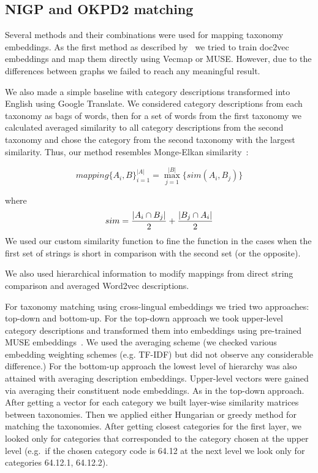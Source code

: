 \documentclass[11pt,a4paper]{article}
\begin{document}
\subsection{NIGP and OKPD2 matching}
Several methods and their combinations were used for mapping taxonomy embeddings. As the first method as described by~\cite{gordeev-fruct}  we tried to train doc2vec embeddings and map them directly using Vecmap or MUSE. However, due to the differences between graphs we failed to reach any meaningful result.

We also made a simple baseline with category descriptions transformed into English using Google Translate. We considered category descriptions from each taxonomy as bags of words, then for a set of words from the first taxonomy we calculated averaged similarity to all category descriptions from the second taxonomy and chose the category from the second taxonomy with the largest similarity. Thus, our method resembles Monge-Elkan similarity~\cite[p.~111]{dupe-detect}:


$$mapping\{A_i, B\}_{i=1}^{|A|} = \max_{j=1}^{|B|}\{sim(A_i,B_j)\}$$

where $$sim = \dfrac{|A_i \cap B_j|}{2} + \\ \dfrac{|B_j \cap A_i|}{2} $$
We used our custom similarity function to fine the function in the cases when the first set of strings is short in comparison with the second set (or the opposite).

We also used hierarchical information to modify mappings from direct string comparison and averaged Word2vec descriptions.

For taxonomy matching using cross-lingual embeddings we tried two approaches: top-down and bottom-up. For the top-down approach we took upper-level category descriptions and transformed them into embeddings using pre-trained MUSE embeddings\ \cite{muse}. We used the averaging scheme (we checked various embedding weighting schemes (e.g. TF-IDF) but did not observe any considerable difference.)
For the bottom-up approach the lowest level of hierarchy was also attained with averaging description embeddings. Upper-level vectors were gained via averaging their constituent node embeddings. As in the top-down approach.
After getting a vector for each category we built layer-wise similarity matrices between taxonomies. Then we applied either Hungarian or greedy method for matching the taxonomies. After getting closest categories for the first layer, we looked only for categories that corresponded to the category chosen at the upper level (e.g.\ if the chosen category code is 64.12 at the next level we look only for categories 64.12.1, 64.12.2).
\end{document}
